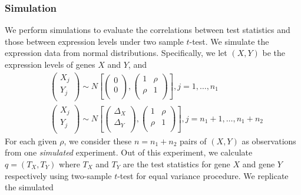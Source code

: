	\subsubsection{Simulation}
	We perform simulations to evaluate the correlations between test statistics and those between 
	expression levels under two sample $t$-test. We simulate the expression data from normal 
	distributions. Specifically, we let $(X, Y)$ be the expression levels of genes $X$ and $Y$, and
	\begin{equation}
	\begin{aligned}
	&\left( \begin{array}{c}
	X_{j}\\
	Y_{j}\\
	\end{array}\right)
	\sim N\left[
	\left(\begin{array}{c}
	0\\
	0\\
	\end{array} \right), 
	\left(
	\begin{array}{cc}
	1 &\rho  \\
	\rho & 	1 \\
	\end{array}
	\right)
	\right], j = 1, \ldots, n_1 \\
	& \left( \begin{array}{c}
	X_{j}\\
	Y_{j}\\
	\end{array}\right)
	\sim N\left[
	\left(\begin{array}{c}
	\Delta_X\\
	\Delta_Y\\
	\end{array} \right), 
	\left(
	\begin{array}{cc}
	1 &\rho \\
	\rho  & 	1 \\
	\end{array}
	\right)
	\right], j = n_1 +1, \ldots, n_1 + n_2 
	\end{aligned}
	\end{equation}
	For each given $\rho$, we 
	consider these $n=n_1 + n_2$ pairs of $(X, Y)$
	as observations from one \textit{simulated} experiment. Out of this experiment, we calculate $q 
	= (T_X, T_Y)$ where $T_X$ and $T_Y$ are the test statistics for gene $X$ and gene $Y$ 
	respectively using 
	two-sample $t$-test for equal variance procedure. We replicate the simulated
